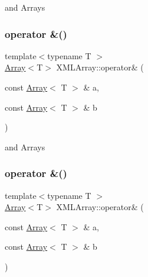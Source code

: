 and Arrays 

\mbox{\label{namespaceXMLArray_a4e97a656e19bfbb4c5574c3a60b2ed93}} 
\subsubsection{\texorpdfstring{operator \&()}{operator \&()}\hspace{0.1cm}{\footnotesize\ttfamily [2/3]}}
{\footnotesize\ttfamily template$<$typename T $>$ \\
\mbox{\hyperlink{classXMLArray_1_1Array}{Array}}$<$T$>$ X\+M\+L\+Array\+::operator\& (\begin{DoxyParamCaption}\item[{const \mbox{\hyperlink{classXMLArray_1_1Array}{Array}}$<$ T $>$ \&}]{a,  }\item[{const \mbox{\hyperlink{classXMLArray_1_1Array}{Array}}$<$ T $>$ \&}]{b }\end{DoxyParamCaption})\hspace{0.3cm}{\ttfamily [inline]}}



and Arrays 

\mbox{\label{namespaceXMLArray_a4e97a656e19bfbb4c5574c3a60b2ed93}} 
\subsubsection{\texorpdfstring{operator \&()}{operator \&()}\hspace{0.1cm}{\footnotesize\ttfamily [3/3]}}
{\footnotesize\ttfamily template$<$typename T $>$ \\
\mbox{\hyperlink{classXMLArray_1_1Array}{Array}}$<$T$>$ X\+M\+L\+Array\+::operator\& (\begin{DoxyParamCaption}\item[{const \mbox{\hyperlink{classXMLArray_1_1Array}{Array}}$<$ T $>$ \&}]{a,  }\item[{const \mbox{\hyperlink{classXMLArray_1_1Array}{Array}}$<$ T $>$ \&}]{b }\end{DoxyParamCaption})\hspace{0.3cm}{\ttfamily [inline]}}



